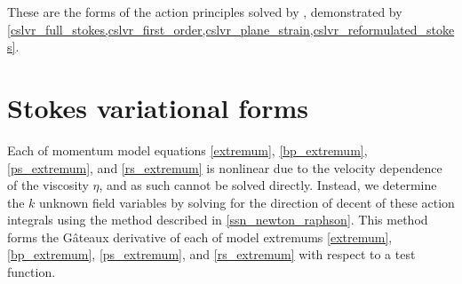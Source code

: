 These are the forms of the action principles solved by \CSLVR, demonstrated by \cref{cslvr_full_stokes,cslvr_first_order,cslvr_plane_strain,cslvr_reformulated_stokes}.




\section{Stokes variational forms} \label{ssn_stokes_variational_forms}
  
Each of momentum model equations \cref{extremum}, \cref{bp_extremum}, \cref{ps_extremum}, and \cref{rs_extremum} is nonlinear due to the velocity dependence of the viscosity $\eta$, and as such cannot be solved directly.  Instead, we determine the $k$ unknown field variables by solving for the direction of decent of these action integrals using the method described in \cref{ssn_newton_raphson}.  This method forms the G\^{a}teaux derivative of each of model extremums \cref{extremum}, \cref{bp_extremum}, \cref{ps_extremum}, and \cref{rs_extremum} with respect to a test function.

